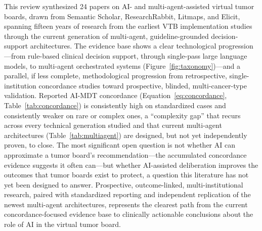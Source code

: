 \documentclass[acmsmall,screen=true,review=false,nonacm=true]{acmart}
\begin{document}
This review synthesized 24 papers on AI- and multi-agent-assisted virtual tumor boards, drawn from Semantic Scholar, ResearchRabbit, Litmaps, and Elicit, spanning fifteen years of research from the earliest VTB implementation studies through the current generation of multi-agent, guideline-grounded decision-support architectures. The evidence base shows a clear technological progression---from rule-based clinical decision support, through single-pass large language models, to multi-agent orchestrated systems (Figure~\ref{fig:taxonomy})---and a parallel, if less complete, methodological progression from retrospective, single-institution concordance studies toward prospective, blinded, multi-cancer-type validation. Reported AI-MDT concordance (Equation~\eqref{eq:concordance}, Table~\ref{tab:concordance}) is consistently high on standardized cases and consistently weaker on rare or complex ones, a ``complexity gap'' that recurs across every technical generation studied and that current multi-agent architectures (Table~\ref{tab:multiagent}) are designed, but not yet independently proven, to close. The most significant open question is not whether AI can approximate a tumor board's recommendation---the accumulated concordance evidence suggests it often can---but whether AI-assisted deliberation improves the outcomes that tumor boards exist to protect, a question this literature has not yet been designed to answer. Prospective, outcome-linked, multi-institutional research, paired with standardized reporting and independent replication of the newest multi-agent architectures, represents the clearest path from the current concordance-focused evidence base to clinically actionable conclusions about the role of AI in the virtual tumor board.



\end{document}
